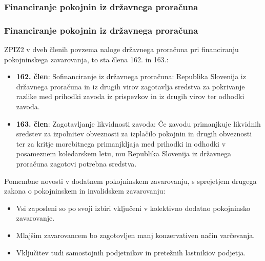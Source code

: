 \documentclass[10pt]{beamer}
\begin{document}
\begin{frame}
\subsubsection[Financiranje pokojnin iz državnega proračuna]{Financiranje pokojnin iz državnega proračuna}
	\frametitle{Financiranje pokojnin iz državnega proračuna}
	ZPIZ2 v dveh členih povzema naloge državnega proračuna pri financiranju pokojninskega zavarovanja, to sta 	člena 162. in 163.:
	\begin{itemize}
	\item \textbf{162. člen}: Sofinanciranje iz državnega proračuna: Republika Slovenija iz državnega proračuna in iz drugih virov zagotavlja sredstva za pokrivanje razlike med 				prihodki zavoda iz prispevkov in iz drugih virov ter odhodki zavoda.
	\item \textbf{163. člen}: Zagotavljanje likvidnosti zavoda: Če zavodu primanjkuje likvidnih sredstev za izpolnitev obveznosti za izplačilo pokojnin in drugih obveznosti 				ter za kritje morebitnega primanjkljaja med prihodki in odhodki v posameznem koledarskem letu, mu Republika Slovenija iz državnega proračuna zagotovi potrebna 				sredstva.
\end{itemize}

Pomembne novosti v dodatnem pokojninskem zavarovanju, s sprejetjem drugega zakona o  pokojninskem in invalidskem zavarovanju:
\begin{itemize}
	\item Vsi zaposleni so po svoji izbiri vključeni v kolektivno dodatno pokojninsko zavarovanje.
	\item Mlajšim zavarovancem bo zagotovljen manj konzervativen način varčevanja.
	\item Vključitev tudi samostojnih podjetnikov in pretežnih lastnikiov podjetja.
\end{itemize}
\end{frame}
\end{document}
